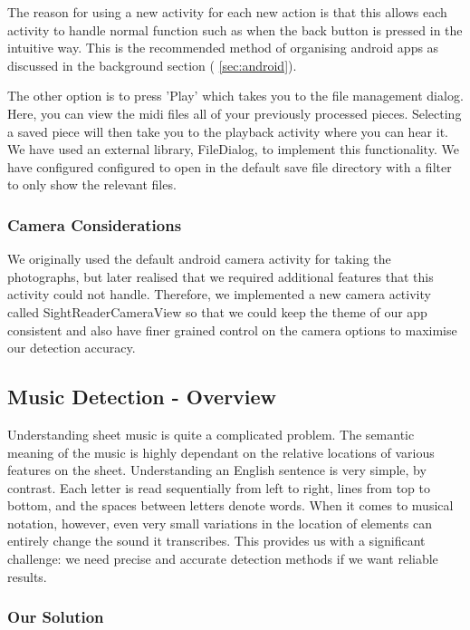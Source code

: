 The reason for using a new activity for each new action is that this allows each activity to handle normal function such as when the back button is pressed in the intuitive way. This is the recommended method of organising android apps as discussed in the background section ( \autoref{sec:android}).

The other option is to press 'Play' which takes you to the file management dialog. Here, you can view the midi files all of your previously processed pieces. Selecting a saved piece will then take you to the playback activity where you can hear it. We have used an external library, FileDialog\cite{FileDialog}, to implement this functionality. We have configured configured to open in the default save file directory with a filter to only show the relevant files.


\subsubsection{Camera Considerations}
We originally used the default android camera activity for taking the photographs, but later realised that we required additional features that this activity could not handle. Therefore, we implemented a new camera activity called SightReaderCameraView so that we could keep the theme of our app consistent and also have finer grained control on the camera options to maximise our detection accuracy.

\subsection{Music Detection - Overview}
Understanding sheet music is quite a complicated problem. The semantic meaning of the music is highly dependant on the relative locations of various features on the sheet. Understanding an English sentence is very simple, by contrast. Each letter is read sequentially from left to right, lines from top to bottom, and the spaces between letters denote words. When it comes to musical notation, however, even very small variations in the location of elements can entirely change the sound it
transcribes. This provides us with a significant challenge: we need precise and accurate detection methods if we want reliable results.

\subsubsection{Our Solution}

